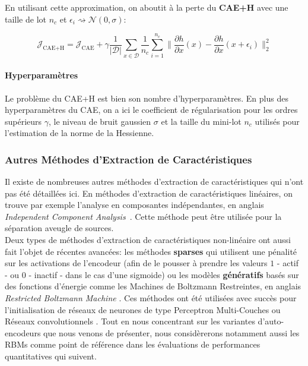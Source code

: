 En utilisant cette approximation,  on aboutit à la perte du \textbf{CAE+H} avec
une taille de lot $n_c$ et $\epsilon_i \rightsquigarrow \mathcal{N}(0,\sigma)$:

\begin{equation}
\mathcal{J}_\textrm{CAE+H} = \mathcal{J}_\textrm{CAE} + \gamma\frac{1}{\vert \mathcal{D}\vert}\sum_{x\in\mathcal{D}} \frac{1}{n_c}\sum^{n_c}_{i=1} \| \dfrac{\partial h}{\partial x}(x) - \dfrac{\partial h}{\partial x}(x+\epsilon_i) \|^2_2 
\label{eq:cae}
\end{equation}

\paragraph{Hyperparamètres} Le problème du CAE+H est bien son nombre
d'hyperparamètres. En plus des hyperparamètres du CAE, on a ici le coefficient
de régularisation pour les ordres supérieurs $\gamma$, le niveau de bruit
gaussien $\sigma$ et la taille du mini-lot $n_c$ utilisés pour l'estimation de
la norme de la Hessienne.

\subsubsection{Autres Méthodes d'Extraction de Caractéristiques}

Il existe de nombreuses autres méthodes d'extraction de caractéristiques qui
n'ont pas été détaillées ici. En méthodes d'extraction de
caractéristiques linéaires, on trouve par exemple l'analyse en composantes
indépendantes, en anglais \textit{Independent Component Analysis}~\cite{Comon94,Hyvarinen-2001}. Cette
méthode peut être utilisée pour la séparation aveugle de sources.
\\

Deux types de méthodes d'extraction de caractéristiques non-linéaire  ont aussi
fait l'objet de récentes avancées: les méthodes {\bf sparses}
\cite{ranzato-08,koray-psd-08,Koray-08} qui utilisent une pénalité sur les
activations de l'encodeur (afin de le pousser à prendre les valeurs $1$ - actif
- ou $0$ - inactif - dans le cas d'une sigmoide)  ou les modèles {\bf
génératifs} basés sur des fonctions d'énergie \cite{ranzato-unsup-07} comme les
Machines de Boltzmann Restreintes, en anglais \textit{Restricted Boltzmann
Machine} \cite{Tieleman08}.  Ces méthodes ont été utilisées avec succès pour
l'initialisation de réseaux de neurones de type Perceptron Multi-Couches
\cite{HintonG2006,ranzato-08,koray-psd-08,Koray-08} ou Réseaux convolutionnels
\cite{koray-nips-10-small}.  Tout en nous concentrant sur les variantes
d'auto-encodeurs que nous venons de présenter, nous considèrerons notamment
aussi les RBMs comme point de référence dans les évaluations de performances
quantitatives qui suivent.


